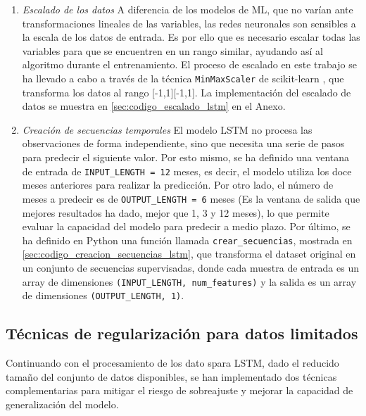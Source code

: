 \begin{enumerate}
    \item \emph{Escalado de los datos}
    A diferencia de los modelos de ML, que no varían ante transformaciones lineales de las variables, las redes neuronales son sensibles a la escala de los datos de entrada. Es por ello que es necesario escalar todas las variables para que se encuentren en un rango similar, ayudando así al algoritmo durante el entrenamiento. El proceso de escalado en este trabajo se ha llevado a cabo a través de la técnica \texttt{MinMaxScaler} de scikit-learn \cite{minmaxscaler}, que transforma los datos al rango [-1,1][-1,1]. La implementación del escalado de datos se muestra en \ref{sec:codigo_escalado_lstm} en el Anexo.

    \item \emph{Creación de secuencias temporales}
    El modelo LSTM no procesa las observaciones de forma independiente, sino que necesita una serie de pasos para predecir el siguiente valor. Por esto mismo, se ha definido una ventana de entrada de \texttt{INPUT\_LENGTH = 12} meses, es decir, el modelo utiliza los doce meses anteriores para realizar la predicción. Por otro lado, el número de meses a predecir es de \texttt{OUTPUT\_LENGTH = 6} meses (Es la ventana de salida que mejores resultados ha dado, mejor que 1, 3 y 12 meses), lo que permite evaluar la capacidad del modelo para predecir a medio plazo. Por último, se ha definido en Python una función llamada \texttt{crear\_secuencias}, mostrada en \ref{sec:codigo_creacion_secuencias_lstm}, que transforma el dataset original en un conjunto de secuencias supervisadas, donde cada muestra de entrada es un array de dimensiones \texttt{(INPUT\_LENGTH, num\_features)} y la salida es un array de dimensiones \texttt{(OUTPUT\_LENGTH, 1)}.
\end{enumerate}

\subsection{Técnicas de regularización para datos limitados}
Continuando con el procesamiento de los dato spara LSTM, dado el reducido tamaño del conjunto de datos disponibles, se han implementado dos técnicas complementarias para mitigar el riesgo de sobreajuste y mejorar la capacidad de generalización del modelo.


